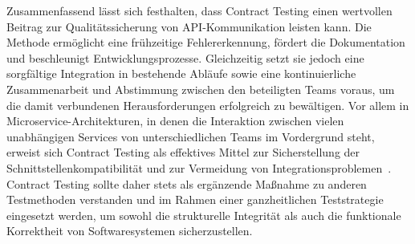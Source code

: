 Zusammenfassend lässt sich festhalten, dass Contract Testing einen wertvollen Beitrag zur Qualitätssicherung von \gls{API}-Kommunikation leisten kann.
Die Methode ermöglicht eine frühzeitige Fehlererkennung, fördert die Dokumentation und beschleunigt Entwicklungsprozesse.
Gleichzeitig setzt sie jedoch eine sorgfältige Integration in bestehende Abläufe sowie eine kontinuierliche Zusammenarbeit und Abstimmung zwischen den beteiligten Teams voraus, um die damit verbundenen Herausforderungen erfolgreich zu bewältigen.
Vor allem in Microservice-Architekturen, in denen die Interaktion zwischen vielen unabhängigen Services von unterschiedlichen Teams im Vordergrund steht, erweist sich Contract Testing als effektives Mittel zur Sicherstellung der Schnittstellenkompatibilität und zur Vermeidung von Integrationsproblemen~\cite{richardsonMicroservicesPatterns2018}.
Contract Testing sollte daher stets als ergänzende Maßnahme zu anderen Testmethoden verstanden und im Rahmen einer ganzheitlichen Teststrategie eingesetzt werden, um sowohl die strukturelle Integrität als auch die funktionale Korrektheit von Softwaresystemen sicherzustellen.

